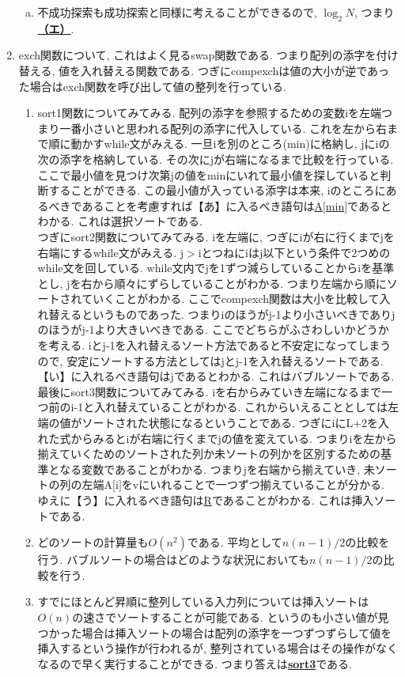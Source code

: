 \documentclass[dvipdfmx,titlepage, 11pt, a4paper]{jsarticle}%
\begin{document}
\begin{enumerate}[(1)]
\begin{enumerate}[(a)]
  \item 不成功探索も成功探索と同様に考えることができるので, $\log_{2}N$, つまり\underline{\bf （エ）}.
  \end{enumerate}
\item exch関数について, これはよく見るswap関数である. つまり配列の添字を付け替える, 値を入れ替える関数である. つぎにcompexchは値の大小が逆であった場合はexch関数を呼び出して値の整列を行っている.
  \begin{enumerate}[({3}$-$a)]
  \item sort1関数についてみてみる. 配列の添字を参照するための変数iを左端つまり一番小さいと思われる配列の添字に代入している. これを左から右まで順に動かすwhile文がみえる. 一旦iを別のところ(min)に格納し, jにiの次の添字を格納している. その次にjが右端になるまで比較を行っている. ここで最小値を見つけ次第jの値をminにいれて最小値を探していると判断することができる. この最小値が入っている添字は本来, iのところにあるべきであることを考慮すれば【あ】に入るべき語句は\underline{A$[$min$]$}であるとわかる. これは選択ソートである.\\
    つぎにsort2関数についてみてみる. iを左端に, つぎにiが右に行くまでjを右端にするwhile文がみえる. j$>$iとつねにiはj以下という条件で2つめのwhile文を回している. while文内でjを1ずつ減らしていることからiを基準とし, jを右から順々にずらしていることがわかる. つまり左端から順にソートされていくことがわかる.  ここでcompexch関数は大小を比較して入れ替えるというものであった. つまりiのほうがj-1より小さいべきでありjのほうがj-1より大きいべきである. ここでどちらがふさわしいかどうかを考える. iとj-1を入れ替えるソート方法であると不安定になってしまうので, 安定にソートする方法としてはjとj-1を入れ替えるソートである.  【い】に入れるべき語句は\underline{j}であるとわかる. これはバブルソートである.\\
    最後にsort3関数についてみてみる. iを右からみていき左端になるまで一つ前のi-1と入れ替えていることがわかる. これからいえることとしては左端の値がソートされた状態になるということである. つぎにiにL+2を入れた式からみるとiが右端に行くまでjの値を変えている. つまりiを左から揃えていくためのソートされた列か未ソートの列かを区別するための基準となる変数であることがわかる. つまりjを右端から揃えていき, 未ソートの列の左端A$[$i$]$をvにいれることで一つずつ揃えていることが分かる. ゆえに【う】に入れるべき語句は\underline{R}であることがわかる. これは挿入ソートである.
  \item どのソートの計算量も\underline{$O(n^{2})$}である. 平均として$n(n-1)/2$の比較を行う. バブルソートの場合はどのような状況においても$n(n-1)/2$の比較を行う.
  \item すでにほとんど昇順に整列している入力列については挿入ソートは$O(n)$の速さでソートすることが可能である. というのも小さい値が見つかった場合は挿入ソートの場合は配列の添字を一つずつずらして値を挿入するという操作が行われるが, 整列されている場合はその操作がなくなるので早く実行することができる. つまり答えは\underline{\bf sort3}である.

\end{enumerate}
\end{enumerate}
\end{document}
